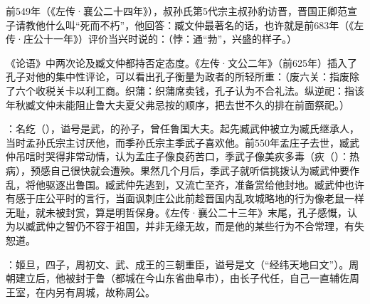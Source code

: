 前549年（《左传·襄公二十四年》），叔孙氏第5代宗主叔孙豹访晋，晋国正卿范宣子请教他什么叫“死而不朽”，他回答：臧文仲最著名的话，也许就是前683年（《左传·庄公十一年》）评价当兴时说的：（悖：通“勃”，兴盛的样子。）

《论语》中两次论及臧文仲都持否定态度。《左传·文公二年》（前625年）插入了孔子对他的集中性评论，可以看出孔子衡量为政者的所轻所重：（废六关：指废除了六个收税关卡以利工商。织蒲：织蒲席卖钱，孔子认为不合礼法。纵逆祀：指该年秋臧文仲未能阻止鲁大夫夏父弗忌按的顺序，把去世不久的排在前面祭祀。）

：名纥（），谥号是武，的孙子，曾任鲁国大夫。起先臧武仲被立为臧氏继承人，当时孟孙氏宗主讨厌他，而季孙氏宗主季武子喜欢他。前550年孟庄子去世，臧武仲吊唁时哭得非常动情，认为孟庄子像良药苦口，季武子像美疢多毒（疢（）：热病），预感自己很快就会遭殃。果然几个月后，季武子就听信挑拨认为臧武仲要作乱，将他驱逐出鲁国。臧武仲先逃到，又流亡至齐，准备赏给他封地。臧武仲也许有感于庄公平时的言行，当面讽刺庄公此前趁晋国内乱攻城略地的行为像老鼠一样无耻，就未被封赏，算是明哲保身。《左传·襄公二十三年》末尾，孔子感慨，认为以臧武仲之智仍不容于祖国，并非无缘无故，而是他的某些行为不合常理，有失恕道。

：姬旦，四子，周初文、武、成王的三朝重臣，谥号是文（“经纬天地曰文”）。周朝建立后，他被封于鲁（都城在今山东省曲阜市），由长子代任，自己一直辅佐周王室，在内另有周城，故称周公。

